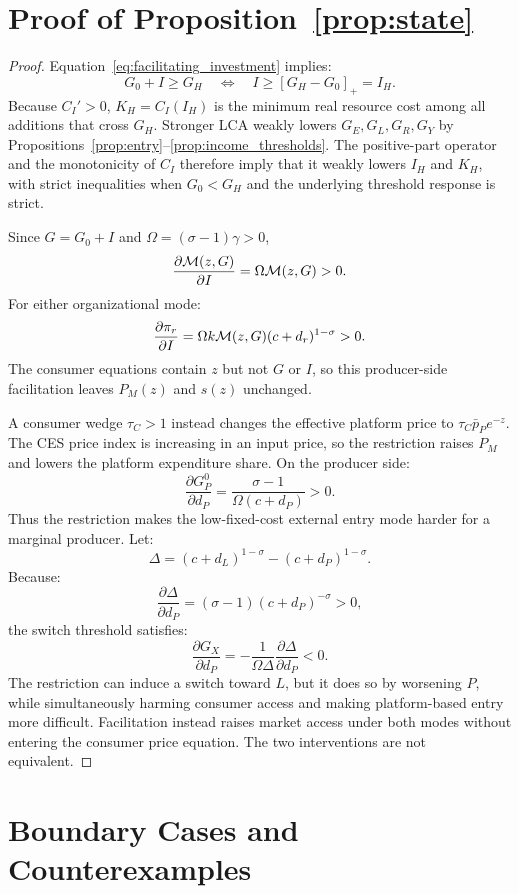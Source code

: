 \section{Proof of Proposition~\ref{prop:state}}

\begin{proof}
Equation~\eqref{eq:facilitating_investment} implies:
\[
G_0+I\geq G_H
\quad\Longleftrightarrow\quad
I\geq [G_H-G_0]_+=I_H.
\]
Because \(C_I'>0\), \(K_H=C_I(I_H)\) is the minimum real resource cost among
all additions that cross \(G_H\).  Stronger LCA weakly lowers
\(G_E,G_L,G_R,G_Y\) by
Propositions~\ref{prop:entry}--\ref{prop:income_thresholds}.  The positive-part
operator and the monotonicity of \(C_I\) therefore imply that it weakly lowers
\(I_H\) and \(K_H\), with strict inequalities when \(G_0<G_H\) and the
underlying threshold response is strict.

Since \(G=G_0+I\) and \(\Omega=(\sigma-1)\gamma>0\),
\[
\frac{\partial\mathcal M(z,G)}{\partial I}
=
\Omega\mathcal M(z,G)>0.
\]
For either organizational mode:
\[
\frac{\partial\pi_r}{\partial I}
=
\Omega k\mathcal M(z,G)(c+d_r)^{1-\sigma}>0.
\]
The consumer equations contain \(z\) but not \(G\) or \(I\), so this
producer-side facilitation leaves \(P_M(z)\) and \(s(z)\) unchanged.

A consumer wedge \(\tau_C>1\) instead changes the effective platform price to
\(\tau_C\bar p_Pe^{-z}\).  The CES price index is increasing in an input
price, so the restriction raises \(P_M\) and lowers the platform expenditure
share.  On the producer side:
\[
\frac{\partial G_P^0}{\partial d_P}
=
\frac{\sigma-1}{\Omega(c+d_P)}>0.
\]
Thus the restriction makes the low-fixed-cost external entry mode harder for a
marginal producer.  Let:
\[
\Delta=(c+d_L)^{1-\sigma}-(c+d_P)^{1-\sigma}.
\]
Because:
\[
\frac{\partial\Delta}{\partial d_P}
=
(\sigma-1)(c+d_P)^{-\sigma}>0,
\]
the switch threshold satisfies:
\[
\frac{\partial G_X}{\partial d_P}
=
-\frac{1}{\Omega\Delta}
\frac{\partial\Delta}{\partial d_P}<0.
\]
The restriction can induce a switch toward \(L\), but it does so by worsening
\(P\), while simultaneously harming consumer access and making
platform-based entry more difficult.  Facilitation instead raises market
access under both modes without entering the consumer price equation.  The
two interventions are not equivalent.
\end{proof}

\section{Boundary Cases and Counterexamples}

